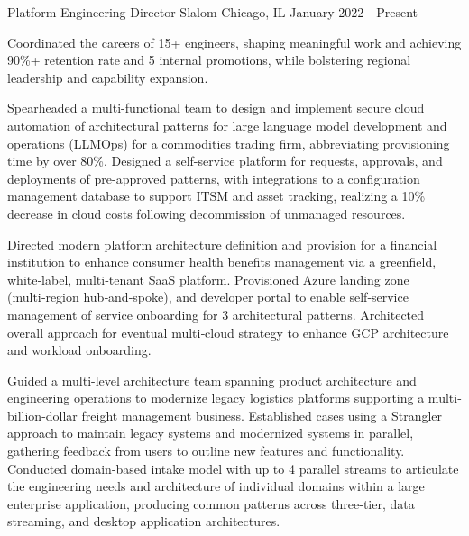 

\begin{cventries}

  \cventry
    {Platform Engineering Director} %
    {Slalom} %
    {Chicago, IL} %
    {January 2022 - Present} %
    {
      \begin{cvitems} %
        \item {Coordinated the careers of 15+ engineers, shaping meaningful work and achieving 90\%+ retention rate and 5 internal promotions, while bolstering regional leadership and capability expansion.}
        \item {Spearheaded a multi-functional team to design and implement secure cloud automation of architectural patterns for large language model development and operations (LLMOps) for a commodities trading firm, abbreviating provisioning time by over 80\%. Designed a self-service platform for requests, approvals, and deployments of pre-approved patterns, with integrations to a configuration management database to support ITSM and asset tracking, realizing a 10\% decrease in cloud costs following decommission of unmanaged resources.}
        \item {Directed modern platform architecture definition and provision for a financial institution to enhance consumer health benefits management via a greenfield, white‑label, multi‑tenant SaaS platform. Provisioned Azure landing zone (multi‑region hub‑and‑spoke), and developer portal to enable self‑service management of service onboarding for 3 architectural patterns. Architected overall approach for eventual multi‑cloud strategy to enhance GCP architecture and workload onboarding.}
        \item {Guided a multi-level architecture team spanning product architecture and engineering operations to modernize legacy logistics platforms supporting a multi-billion-dollar freight management business. Established cases using a Strangler approach to maintain legacy systems and modernized systems in parallel, gathering feedback from users to outline new features and functionality. Conducted domain-based intake model with up to 4 parallel streams to articulate the engineering needs and architecture of individual domains within a large enterprise application, producing common patterns across three-tier, data streaming, and desktop application architectures.}
      \end{cvitems}
    }


\end{cventries}

